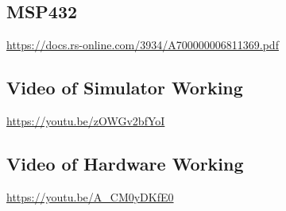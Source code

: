 \documentclass[a4paper,12pt]{article}
\begin{document}
\subsection{MSP432}
\url{https://docs.rs-online.com/3934/A700000006811369.pdf}
\subsection{Video of Simulator Working}
\url{https://youtu.be/zOWGv2bfYoI}
\subsection{Video of Hardware Working}
\url{https://youtu.be/A_CM0yDKfE0}


\pagebreak
\printbibliography
\end{document}
